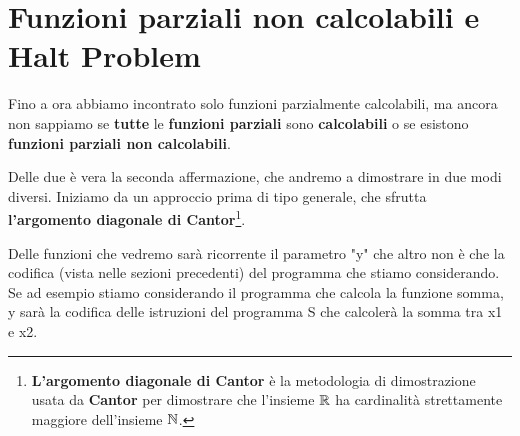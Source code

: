 \section{Funzioni parziali non calcolabili e Halt Problem}

Fino a ora abbiamo incontrato solo funzioni parzialmente calcolabili, ma ancora non sappiamo se \textbf{tutte} le \textbf{funzioni parziali} sono \textbf{calcolabili} o se esistono \textbf{funzioni parziali non calcolabili}.

Delle due è vera la seconda affermazione, che andremo a dimostrare in due modi diversi. Iniziamo da un approccio prima di tipo generale, che sfrutta \textbf{l'argomento diagonale di Cantor}\footnote{\textbf{L'argomento diagonale di Cantor} è la metodologia di dimostrazione usata da \textbf{Cantor} per dimostrare che l'insieme \(\mathbb{R}\) ha cardinalità strettamente maggiore dell'insieme \(\mathbb{N}\).}.

Delle funzioni che vedremo sarà ricorrente il parametro "y" che altro non è che la codifica (vista nelle sezioni precedenti) del programma che stiamo considerando. Se ad esempio stiamo considerando il programma che calcola la funzione somma, y sarà la codifica delle istruzioni del programma S che calcolerà la somma tra x1 e x2.

